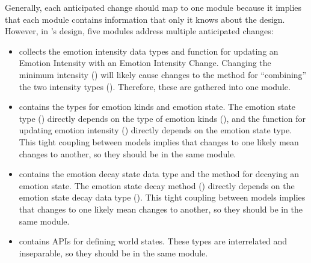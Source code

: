 Generally, each anticipated change should map to one module because it implies
that each module contains information that only it knows about the design.
However, in \progname{}'s design, five modules address multiple anticipated
changes:
\begin{itemize}

    \item {} collects the emotion intensity data types and
    function for updating an Emotion Intensity with an Emotion Intensity
    Change. Changing the minimum intensity () will
    likely cause changes to the method for ``combining'' the two intensity
    types (). Therefore, these are gathered into
    one module.

    \item {} contains the types for emotion kinds and emotion
    state. The emotion state type () directly depends
    on the type of emotion kinds (), and the function
    for updating emotion intensity () directly
    depends on the emotion state type. This tight coupling between models
    implies that changes to one likely mean changes to another, so they should
    be in the same module.

    \item {} contains the emotion decay state data type and the
    method for decaying an emotion state. The emotion state decay method
    () directly depends on the emotion state decay data
    type (). This tight coupling between models
    implies that changes to one likely mean changes to another, so they should
    be in the same module.

    \item {} contains APIs for defining world states. These types
    are interrelated and inseparable, so they should be in the same module.

\end{itemize}